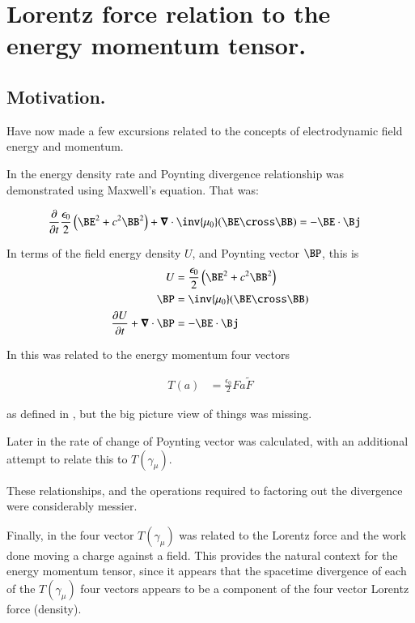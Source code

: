 \chapter{Lorentz force relation to the energy momentum tensor.}\label{chap:PJstressEnergyLorentz}
\date{Feb 13, 2009.  stressEnergyLorentz.tex}

\section{Motivation. }

Have now made a few excursions related to the concepts of electrodynamic
field energy and momentum.

In  the energy density rate and Poynting divergence 
relationship was demonstrated using Maxwell's equation.  That was:

\begin{align}
\PD{t}{}\frac{\epsilon_0}{2} \left(\BE^2 + c^2 \BB^2\right) + \spacegrad \cdot \inv{\mu_0}(\BE \cross \BB) &= -\BE \cdot \Bj 
\end{align}

In terms of the field energy density $U$, and Poynting vector $\BP$, this is
\begin{align}\label{eqn:seLorentz:energyDensityPoyntingDefined}
U &= \frac{\epsilon_0}{2} \left(\BE^2 + c^2 \BB^2\right) \\
\BP &= \inv{\mu_0}(\BE \cross \BB) \\
\PD{t}{U} + \spacegrad \cdot \BP &= -\BE \cdot \Bj 
\end{align}

In  this was related to the 
energy momentum four vectors

\begin{align}\label{eqn:seLorentz:lorentzForceT}
T(a) &= \frac{\epsilon_0}{2} F a \tilde{F}
\end{align}

as defined
in \citep{doran2003gap}, but the big picture view 
of things was missing.

Later in  the rate of change of Poynting vector
was calculated, with an additional attempt to relate this to $T(\gamma_\mu)$.

These relationships, and the operations required to factoring out the divergence were considerably messier.

Finally, in  the four vector $T(\gamma_\mu)$
was related to the Lorentz force and the work done moving a charge against
a field.  This provides the natural context for the energy momentum tensor, 
since it appears that the spacetime divergence of each of the
$T(\gamma_\mu)$ four vectors appears to be a component of the
four vector Lorentz force (density).  

